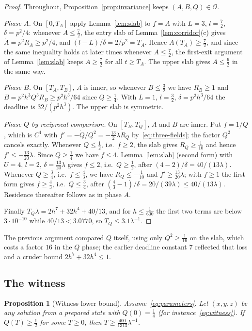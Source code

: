 \documentclass[11pt,a4paper]{article}
\theoremstyle{plain}
\newtheorem{proposition}[theorem]{Proposition}
\theoremstyle{definition}
\theoremstyle{remark}
\newcommand{\calO}{\mathcal O}
\begin{document}
\begin{proof}
Throughout, Proposition~\ref{prop:invariance} keeps $(A,B,Q)\in\calO$.

\emph{Phase $A$.} On $[0,T_A]$ apply Lemma~\ref{lem:slab} to $f=A$ with $L=3$, $l=\tfrac72$, $\delta=p^2/4$: whenever $A\le\tfrac72$, the entry slab of Lemma~\ref{lem:corridor}(c) gives $\dot A=p^2R_A\ge p^2/4$, and $(l-L)/\delta=2/p^2=T_A$. Hence $A(T_A)\ge\tfrac72$, and since the same inequality holds at later times whenever $A\le\tfrac72$, the first-exit argument of Lemma~\ref{lem:slab} keeps $A\ge\tfrac72$ for all $t\ge T_A$. The upper slab gives $A\le\tfrac92$ in the same way.

\emph{Phase $B$.} On $[T_A,T_B]$, $A$ is inner, so whenever $B\le\tfrac32$ we have $R_B\ge1$ and $\dot B=p^2h^3Q^3R_B\ge p^2h^3/64$ since $Q\ge\tfrac14$. With $L=1$, $l=\tfrac32$, $\delta=p^2h^3/64$ the deadline is $32/(p^2h^3)$. The upper slab is symmetric.

\emph{Phase $Q$ by reciprocal comparison.} On $[T_B,T_Q]$, $A$ and $B$ are inner. Put $f=1/Q$, which is $C^1$ with $f'=-\dot Q/Q^2=-\tfrac{13}{2}\lambda R_Q$ by~\eqref{eq:three-fields}; the factor $Q^2$ cancels exactly. Whenever $Q\le\tfrac12$, i.e.\ $f\ge2$, the slab gives $R_Q\ge\tfrac1{10}$ and hence $f'\le-\tfrac{13}{20}\lambda$. Since $Q\ge\tfrac14$ we have $f\le4$. Lemma~\ref{lem:slab} (second form) with $U=4$, $l=2$, $\delta=\tfrac{13}{20}\lambda$ gives $f\le2$, i.e.\ $Q\ge\tfrac12$, after $(4-2)/\delta=40/(13\lambda)$. Whenever $Q\ge\tfrac34$, i.e.\ $f\le\tfrac43$, we have $R_Q\le-\tfrac1{10}$ and $f'\ge\tfrac{13}{20}\lambda$; with $f\ge1$ the first form gives $f\ge\tfrac43$, i.e.\ $Q\le\tfrac34$, after $(\tfrac43-1)/\delta=20/(39\lambda)\le40/(13\lambda)$. Residence thereafter follows as in phase $A$.

Finally $T_Q\lambda=2h^7+32h^4+40/13$, and for $h\le\tfrac1{600}$ the first two terms are below $3\cdot10^{-10}$ while $40/13<3.0770$, so $T_Q\le3.1\lambda^{-1}$.
\end{proof}

The previous argument compared $Q$ itself, using only $Q^2\ge\tfrac1{16}$ on the slab, which costs a factor $16$ in the $Q$ phase; the earlier deadline constant $7$ reflected that loss and a cruder bound $2h^7+32h^4\le1$.

\subsection{The witness}
\begin{proposition}[Witness lower bound]\label{prop:witness}
Assume~\eqref{eq:parameters}. Let $(x,y,z)$ be any solution from a prepared state with $Q(0)=\tfrac14$ (for instance~\eqref{eq:witness}). If $Q(T)\ge\tfrac12$ for some $T\ge0$, then $T\ge\frac{400}{1313}\lambda^{-1}$.
\end{proposition}
\end{document}
